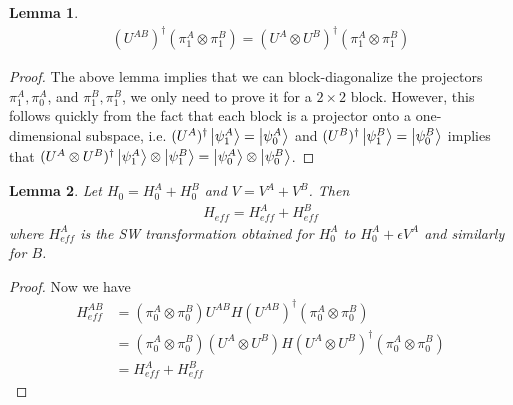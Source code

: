 \documentclass[11pt]{article}
\newtheorem{lem}{Lemma}
\begin{document}
\begin{lem}
    \begin{align}
        (U^{AB})^\dagger (\pi^A_1 \otimes \pi^B_1) = (U^A \otimes U^B)^\dagger(\pi^A_1 \otimes \pi^B_1)
    \end{align}
\end{lem}
\begin{proof}
    The above lemma implies that we can block-diagonalize the projectors $\pi^A_1, \pi^A_0$, and $\pi^B_1, \pi^B_1$, we only need to prove it for a $2\times 2$ block. However, this follows quickly from the fact that each block is a projector onto a one-dimensional subspace, i.e. $(U^A)^\dagger\ket{\psi^A_1} = \ket{\psi^A_0}$ and $(U^B)^\dagger\ket{\psi^B_1} = \ket{\psi^B_0}$ implies that $(U^A \otimes U^B)^\dagger\ket{\psi^A_1}\otimes \ket{\psi^B_1} = \ket{\psi^A_0} \otimes \ket{\psi^B_0}$.
\end{proof}
\begin{lem}
    Let $H_0 = H_0^A + H_0^B$ and $V = V^A + V^B$. Then
    \begin{align}
        H_{eff} = H_{eff}^A + H_{eff}^B
    \end{align}
    where $H_{eff}^A$ is the SW transformation obtained for $H_0^A$ to $H_0^A + \epsilon V^A$ and similarly for $B$.
\end{lem}
\begin{proof}
Now we have
\begin{align}
    H^{AB}_{eff} &= (\pi^A_0 \otimes \pi^B_0) U^{AB}H(U^{AB})^\dagger(\pi^A_0 \otimes \pi^B_0) \\
                 &=  (\pi^A_0 \otimes \pi^B_0) (U^A \otimes U^B)H(U^{A}\otimes U^B)^\dagger(\pi^A_0 \otimes \pi^B_0) \\
                 &= H_{eff}^A + H_{eff}^B
\end{align}
\end{proof}
\end{document}
